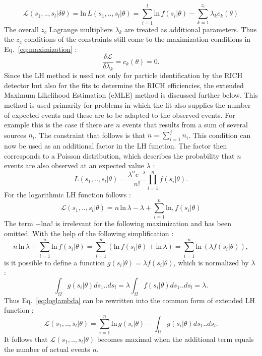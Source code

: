 %
\begin{equation}
  \mathscr{L}\left(s_1,..,s_l|\delta\theta \right) = \text{ln}\, L\left(s_1,..,s_l|\theta \right) = \sum_{i=1}^{l} \text{ln}\, f(s_i|\theta) - \sum_{k=1}^{z_{c}} \lambda_k c_k(\theta)
\end{equation}
%
The overall $z_c$ Lagrange multipliers $\lambda_k$ are treated as additional parameters. Thus the $z_c$ conditions of the constraints still come to the maximization conditions in Eq.~\ref{eq:maximization} :
%
\begin{equation}
  \frac{\delta \mathscr{L}}{\delta \lambda_k} = c_k(\theta) = 0.
\end{equation}
%
Since the LH method is used not only for particle identification by the RICH detector but also for the fits to determine the RICH efficiencies, the extended Maximum Likelihood Estimation (eMLE) method is discussed further below. This method is used primarily for problems in which the fit also supplies the number of expected events and these are to be adapted to the observed events. For example this is the case if there are $n$ events that results from a sum of several sources $n_i$. The constraint that follows is that $n = \sum_{i=1}^{j} n_i$. This condition can now be used as an additional factor in the LH function. The factor then corresponds to a Poisson distribution, which describes the probability that $n$ events are also observed at an expected value $\lambda$ :
%
\begin{equation}
  L\left(s_1,..,s_l|\theta \right) = \frac{\lambda^n e^{-\lambda}}{n!} \prod_{i=1}^{n} f(s_i|\theta).
\end{equation}
%
For the logarithmic LH function follows :
%
\begin{equation}\label{eq:loglambda}
  \mathscr{L}\left(s_1,..,s_l|\theta \right) = n \,\text{ln}\, \lambda - \lambda + \sum_{i=1}^{n} \text{ln},f(s_i|\theta)
\end{equation}
%
The term $- \text{ln} n!$ is irrelevant for the following maximization and has been omitted. With the help of the following simplification :
%
\begin{equation}
  n \,\text{ln}\, \lambda + \sum_{i=1}^{n} \text{ln}\, f(s_i|\theta) =  \sum_{i=1}^{n} \left(\text{ln}\, f(s_i|\theta) + \text{ln}\, \lambda \right) = \sum_{i=1}^{n} \text{ln}\, (\lambda f(s_i|\theta)),
\end{equation}
%
is it possible to define a function $g(s_i|\theta) = \lambda f(s_i|\theta)$, which is normalized by $\lambda$ :
%
\begin{equation}
  \int_{\Omega} g(s_i|\theta) ds_1 .. ds_l = \lambda \int_{\Omega} f(s_i|\theta)ds_1 .. ds_l  = \lambda.
\end{equation}
%
Thus Eq.~\ref{eq:loglambda} can be rewritten into the common form of extended LH function :
%
\begin{equation}
  \mathscr{L}\left(s_1,..,s_l|\theta \right) = \sum_{i=1}^{n} \text{ln}\, g(s_i|\theta) - \int_{\Omega} g(s_i|\theta) ds_1 .. ds_l.
\end{equation}
%
It follows that $\mathscr{L}\left(s_1,..,s_l|\theta \right)$ becomes maximal when the additional term equals the number of actual events $n$.

